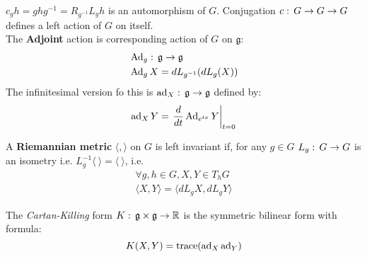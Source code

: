 \documentclass{beamer}
\begin{document}
\begin{frame}
\begin{ddef}
    $c_gh= ghg^{-1} = R_{g^{-1}} L_g h$ is an automorphism of $G$. Conjugation $c:\, G\to G \to G$ defines a left action of $G$ on itself.\\
    The \textbf{Adjoint} action is corresponding action of $G$ on $\mathfrak{g}$:
    \begin{align*}
        &\operatorname{Ad}_g:\, \mathfrak{g} \to \mathfrak{g}\\
        &\operatorname{Ad}_gX=dL_{g^{-1}}(dL_g(X))
    \end{align*}
    The infinitesimal version fo this is $\operatorname{ad}_X:\, \mathfrak{g}\to  \mathfrak{g} $ defined by:
    $$\operatorname{ad}_XY =\left. \frac{d}{dt}\operatorname{Ad}_{e^{tx}}Y\right|_{t=0}$$
\end{ddef}
\end{frame}
\begin{frame}
\begin{ddef}
A \textbf{Riemannian metric} $\langle,\rangle$ on $G$ is left invariant if, for any $g\in G$ $L_g:\, G\to G$ is an isometry i.e. $L^{-1}_g\langle\ \rangle = \langle\ \rangle$, i.e.
\begin{gather}
\forall g,h\in G,X,Y\in T_h G\label{eqs}\\
\langle X,Y\rangle = \langle dL_gX, dL_gY\rangle \label{eqss}
\end{gather}
\end{ddef}
\begin{ddef}
    The \emph{Cartan-Killing} form $K:\, \mathfrak{g}\times \mathfrak{g} \to \mathbb{R}$ is the symmetric bilinear form with formula:
    $$K(X,Y) = \operatorname{trace}(\operatorname{ad}_X \operatorname{ad}_Y)$$
    \end{ddef}
\end{frame}
\end{document}
